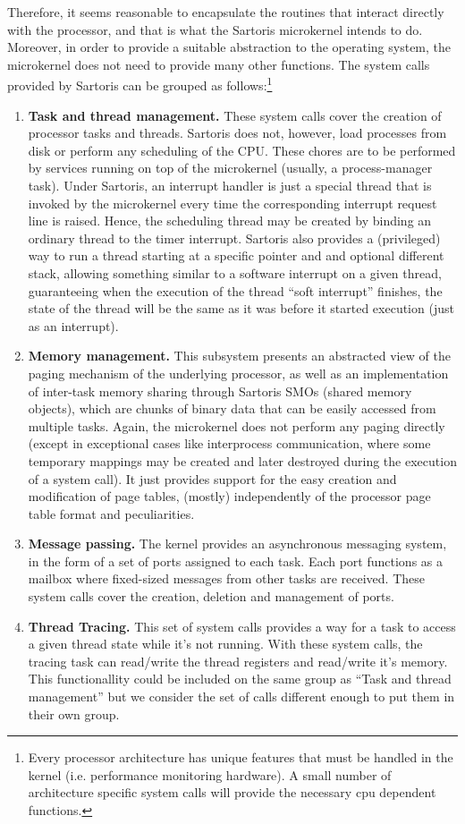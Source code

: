 \documentclass[11pt, letterpaper, twoside, english]{book}
\begin{document}
Therefore, it seems reasonable to encapsulate the routines that interact directly with the processor, and that is what the Sartoris microkernel intends to do. Moreover, in order to provide a suitable abstraction to the operating system, the microkernel does not need to provide many other functions. The system calls provided by Sartoris can be grouped as follows:\footnote{Every processor architecture has unique features that must be handled in the kernel (i.e. performance monitoring hardware). A small number of architecture specific system calls will provide the necessary cpu dependent functions. }

\begin{enumerate}
\item[]\textbf{Task and thread management.} These system calls cover the creation of processor tasks and threads. Sartoris does not, however, load processes from disk or perform any scheduling of the CPU. These chores are to be performed by services running on top of the microkernel (usually, a process-manager task). Under Sartoris, an interrupt handler is just a special thread that is invoked by the microkernel every time the corresponding interrupt request line is raised. Hence, the scheduling thread may be created by binding an ordinary thread to the timer interrupt. Sartoris also provides a (privileged) way to run a thread starting at a specific pointer and and optional different stack, allowing something similar to a software interrupt on a given thread, guaranteeing when the execution of the thread "`soft interrupt"' finishes, the state of the thread will be the same as it was before it started execution (just as an interrupt).
\item[]\textbf{Memory management.} This subsystem presents an abstracted view of the paging mechanism of the underlying processor, as well as an implementation of inter-task memory sharing through Sartoris SMOs (shared memory objects), which are chunks of binary data that can be easily accessed from multiple tasks. Again, the microkernel does not perform any paging directly (except in exceptional cases like interprocess communication, where some temporary mappings may be created and later destroyed during the execution of a system call). It just provides support for the easy creation and modification of page tables, (mostly) independently of the processor page table format and peculiarities.
\item[]\textbf{Message passing.} The kernel provides an asynchronous messaging system, in the form of a set of ports assigned to each task. Each port functions as a mailbox where fixed-sized messages from other tasks are received. These system calls cover the creation, deletion and management of ports.
\item[]\textbf{Thread Tracing.} This set of system calls provides a way for a task to access a given thread state while it's not running. With these system calls, the tracing task can read/write the thread registers and read/write it's memory. This functionallity could be included on the same group as "`Task and thread management"' but we consider the set of calls different enough to put them in their own group.
\end{enumerate}
\end{document}
